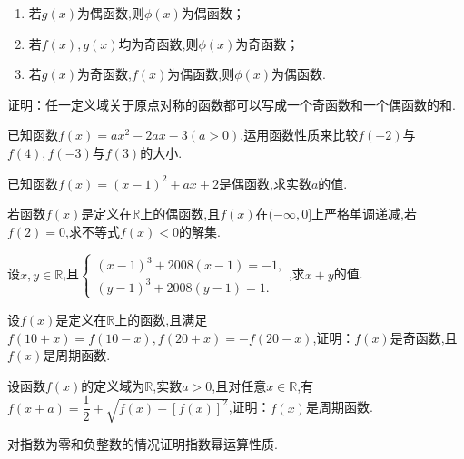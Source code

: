 \documentclass[lang=cn,newtx,10pt,scheme=chinese]{elegantbook}
\begin{document}
\begin{enumerate}
  \item 若$g(x)$为偶函数,则$\phi(x)$为偶函数；
  \item 若$f(x),g(x)$均为奇函数,则$\phi(x)$为奇函数；
  \item 若$g(x)$为奇函数,$f(x)$为偶函数,则$\phi(x)$为偶函数.
\end{enumerate}

\begin{exercise}
  证明：任一定义域关于原点对称的函数都可以写成一个奇函数和一个偶函数的和.
\end{exercise}

\begin{exercise}\label{2017RJB_bx1_P111.B7}
  已知函数$f(x)=ax^2-2ax-3(a>0)$,运用函数性质来比较$f(-2)$与$f(4),f(-3)$与$f(3)$的大小.
\end{exercise}

\begin{exercise}\label{2017RJB_bx1_P111.B8}
  已知函数$f(x)=(x-1)^2+ax+2$是偶函数,求实数$a$的值.
\end{exercise}

\begin{exercise}\label{2017RJB_bx1_P111.C2}
  若函数$f(x)$是定义在$\mathbb{R}$上的偶函数,且$f(x)$在$(-\infty,0]$上严格单调递减,若$f(2)=0$,求不等式$f(x)<0$的解集.
\end{exercise}

\begin{exercise}\label{ASJC_G1_P30.11}
  设$x,y\in\mathbb{R}$,且$\begin{cases}(x-1)^3+2008(x-1)=-1,\\(y-1)^3+2008(y-1)=1.\end{cases}$,求$x+y$的值.
\end{exercise}

\begin{exercise}\label{HS2FZ_lkb1_P57.3}
  设$f(x)$是定义在$\mathbb{R}$上的函数,且满足$f(10+x)=f(10-x),f(20+x)=-f(20-x)$,证明：$f(x)$是奇函数,且$f(x)$是周期函数.
\end{exercise}

\begin{exercise}\label{HS2FZ_lkb1_P55.2}
  设函数$f(x)$的定义域为$\mathbb{R}$,实数$a>0$,且对任意$x\in\mathbb{R}$,有$f(x+a)=\dfrac{1}{2}+\sqrt{f(x)-[f(x)]^{2}}$,证明：$f(x)$是周期函数.
\end{exercise}

\begin{exercise}
  对指数为零和负整数的情况证明指数幂运算性质.
\end{exercise}
\end{document}
